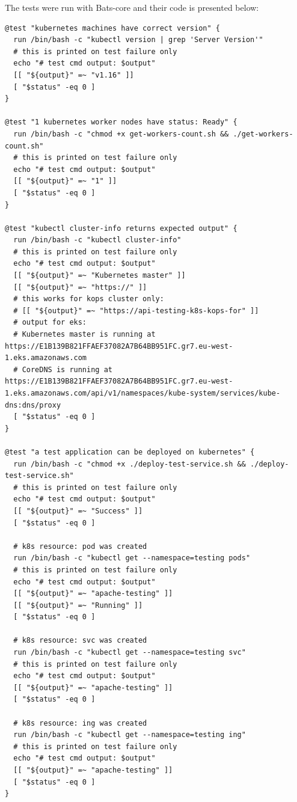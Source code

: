 The tests were run with Bats-core and their code is presented below:
\begin{lstlisting}[basicstyle=\tiny,caption={Bats-core tests}]
@test "kubernetes machines have correct version" {
  run /bin/bash -c "kubectl version | grep 'Server Version'"
  # this is printed on test failure only
  echo "# test cmd output: $output"
  [[ "${output}" =~ "v1.16" ]]
  [ "$status" -eq 0 ]
}

@test "1 kubernetes worker nodes have status: Ready" {
  run /bin/bash -c "chmod +x get-workers-count.sh && ./get-workers-count.sh"
  # this is printed on test failure only
  echo "# test cmd output: $output"
  [[ "${output}" =~ "1" ]]
  [ "$status" -eq 0 ]
}

@test "kubectl cluster-info returns expected output" {
  run /bin/bash -c "kubectl cluster-info"
  # this is printed on test failure only
  echo "# test cmd output: $output"
  [[ "${output}" =~ "Kubernetes master" ]]
  [[ "${output}" =~ "https://" ]]
  # this works for kops cluster only:
  # [[ "${output}" =~ "https://api-testing-k8s-kops-for" ]]
  # output for eks:
  # Kubernetes master is running at https://E1B139B821FFAEF37082A7B64BB951FC.gr7.eu-west-1.eks.amazonaws.com
  # CoreDNS is running at https://E1B139B821FFAEF37082A7B64BB951FC.gr7.eu-west-1.eks.amazonaws.com/api/v1/namespaces/kube-system/services/kube-dns:dns/proxy
  [ "$status" -eq 0 ]
}

@test "a test application can be deployed on kubernetes" {
  run /bin/bash -c "chmod +x ./deploy-test-service.sh && ./deploy-test-service.sh"
  # this is printed on test failure only
  echo "# test cmd output: $output"
  [[ "${output}" =~ "Success" ]]
  [ "$status" -eq 0 ]

  # k8s resource: pod was created
  run /bin/bash -c "kubectl get --namespace=testing pods"
  # this is printed on test failure only
  echo "# test cmd output: $output"
  [[ "${output}" =~ "apache-testing" ]]
  [[ "${output}" =~ "Running" ]]
  [ "$status" -eq 0 ]

  # k8s resource: svc was created
  run /bin/bash -c "kubectl get --namespace=testing svc"
  # this is printed on test failure only
  echo "# test cmd output: $output"
  [[ "${output}" =~ "apache-testing" ]]
  [ "$status" -eq 0 ]

  # k8s resource: ing was created
  run /bin/bash -c "kubectl get --namespace=testing ing"
  # this is printed on test failure only
  echo "# test cmd output: $output"
  [[ "${output}" =~ "apache-testing" ]]
  [ "$status" -eq 0 ]
}


\end{lstlisting}
